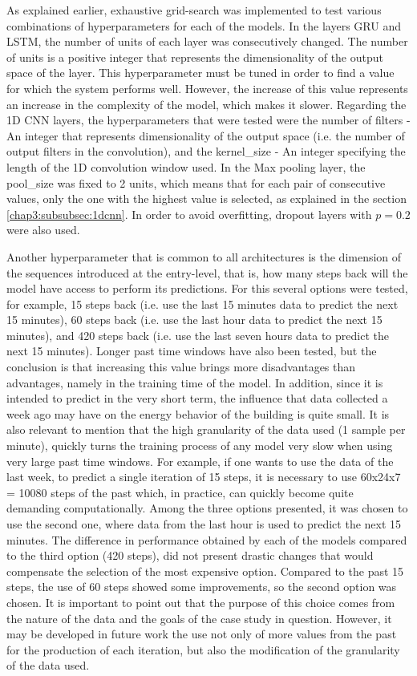 As explained earlier, exhaustive grid-search was implemented to test various combinations of hyperparameters for each of the models. In the layers \ac{GRU} and \ac{LSTM}, the number of units of each layer was consecutively changed.
The number of units is a positive integer that represents the dimensionality of the output space of the layer. This hyperparameter must be tuned in order to find a value for which the system performs well. However, the increase of this value represents an increase in the complexity of the model, which makes it slower. Regarding the \ac{1D CNN} layers, the hyperparameters that were tested were the number of filters - An integer that represents dimensionality of the output space (i.e. the number of output filters in the convolution), and the kernel\_size - An integer specifying the length of the 1D convolution window used. In the Max pooling layer, the pool\_size was fixed to 2 units, which means that for each pair of consecutive values, only the one with the highest value is selected, as explained in the section \ref{chap3:subsubsec:1dcnn}. In order to avoid overfitting, dropout layers with $p=0.2$ were also used.

Another hyperparameter that is common to all architectures is the dimension of the sequences introduced at the entry-level, that is, how many steps back will the model have access to perform its predictions. For this several options were tested, for example, 15 steps back (i.e. use the last 15 minutes data to predict the next 15 minutes), 60 steps back (i.e. use the last hour data to predict the next 15 minutes), and 420 steps back (i.e. use the last seven hours data to predict the next 15 minutes). Longer past time windows have also been tested, but the conclusion is that increasing this value brings more disadvantages than advantages, namely in the training time of the model. In addition, since it is intended to predict in the very short term, the influence that data collected a week ago may have on the energy behavior of the building is quite small. It is also relevant to mention that the high granularity of the data used (1 sample per minute), quickly turns the training process of any model very slow when using very large past time windows. For example, if one wants to use the data of the last week, to predict a single iteration of 15 steps, it is necessary to use 60x24x7 = 10080 steps of the past which, in practice, can quickly become quite demanding computationally. Among the three options presented, it was chosen to use the second one, where data from the last hour is used to predict the next 15 minutes. The difference in performance obtained by each of the models compared to the third option (420 steps), did not present drastic changes that would compensate the selection of the most expensive option. Compared to the past 15 steps, the use of 60 steps showed some improvements, so the second option was chosen. It is important to point out that the purpose of this choice comes from the nature of the data and the goals of the case study in question. However, it may be developed in future work the use not only of more values from the past for the production of each iteration, but also the modification of the granularity of the data used.

